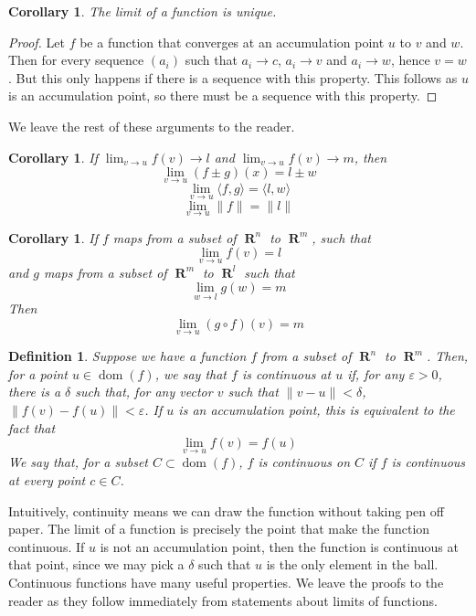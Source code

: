 \documentclass{report}
\newtheorem{corollary}[theorem]{Corollary}
\newtheorem{definition}{Definition}
\DeclareMathOperator{\real}{\mathbf{R}}
\DeclareMathOperator{\dom}{dom}
\begin{document}
\begin{corollary}
  The limit of a function is unique.
\end{corollary}
\begin{proof}
  Let $f$ be a function that converges at an accumulation point $u$ to $v$ and $w$. Then for every sequence $(a_i)$ such that $a_i \to c$, $a_i \to v$ and $a_i \to w$, hence $v = w$. But this only happens if there is a sequence with this property. This follows as $u$ is an accumulation point, so there must be a sequence with this property.
\end{proof}

We leave the rest of these arguments to the reader.

\begin{corollary}
  If $\lim_{v \to u} f(v) \to l$ and $\lim_{v \to u} f(v) \to m$, then
  \[ \lim_{v \to u} (f \pm g)(x) = l \pm w \]
  \[ \lim_{v \to u} \langle f, g \rangle = \langle l, w \rangle \]
  \[ \lim_{v \to u} \| f \| = \| l \| \]
\end{corollary}

\begin{corollary}
  If $f$ maps from a subset of $\real^n$ to $\real^m$, such that
  \[ \lim_{v \to u} f(v) = l \]
  and $g$ maps from a subset of $\real^m$ to $\real^l$ such that
  \[ \lim_{w \to l} g(w) = m \]
  Then
  \[ \lim_{v \to u} (g \circ f)(v) = m \]
\end{corollary}

\begin{definition}
  Suppose we have a function $f$ from a subset of $\real^n$ to $\real^m$. Then, for a point $u \in \dom(f)$, we say that $f$ is continuous at $u$ if, for any $\varepsilon > 0$, there is a $\delta$ such that, for any vector $v$ such that $\| v - u \| < \delta$, $\| f(v) - f(u) \| < \varepsilon$. If $u$ is an accumulation point, this is equivalent to the fact that
  \[ \lim_{v \to u} f(v) = f(u) \]
  We say that, for a subset $C \subset \dom(f)$, $f$ is continuous on $C$ if $f$ is continuous at every point $c \in C$.
\end{definition}

Intuitively, continuity means we can draw the function without taking pen off paper. The limit of a function is precisely the point that make the function continuous. If $u$ is not an accumulation point, then the function is continuous at that point, since we may pick a $\delta$ such that $u$ is the only element in the ball. Continuous functions have many useful properties. We leave the proofs to the reader as they follow immediately from statements about limits of functions.
\end{document}

